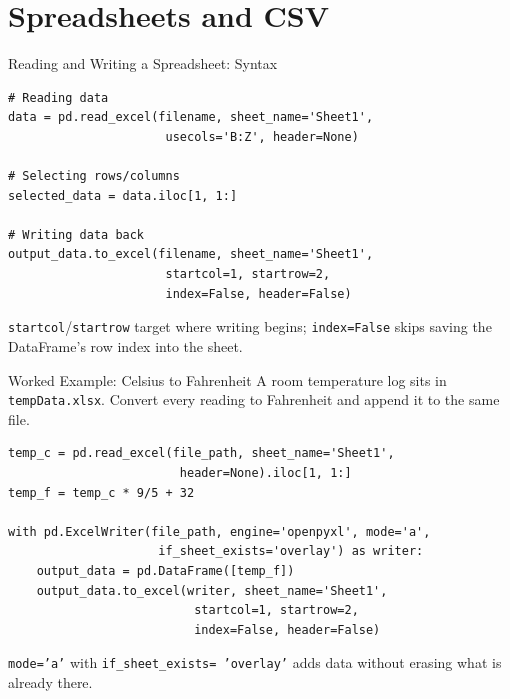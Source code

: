 \documentclass[9pt,aspectratio=169,xcolor=table]{beamer}
\begin{document}
\section{Spreadsheets and CSV}

\begin{frame}[fragile]{Reading and Writing a Spreadsheet: Syntax}
    \leavevmode
\begin{lstlisting}
# Reading data
data = pd.read_excel(filename, sheet_name='Sheet1',
                      usecols='B:Z', header=None)

# Selecting rows/columns
selected_data = data.iloc[1, 1:]

# Writing data back
output_data.to_excel(filename, sheet_name='Sheet1',
                      startcol=1, startrow=2,
                      index=False, header=False)
\end{lstlisting}

    \vspace{1mm}
    {\small \texttt{startcol}/\texttt{startrow} target where writing
    begins; \texttt{index=False} skips saving the DataFrame's row
    index into the sheet.}
\end{frame}

\begin{frame}[fragile]{Worked Example: Celsius to Fahrenheit}
    \leavevmode
    A room temperature log sits in \texttt{tempData.xlsx}. Convert
    every reading to Fahrenheit and append it to the same file.

\begin{lstlisting}
temp_c = pd.read_excel(file_path, sheet_name='Sheet1',
                        header=None).iloc[1, 1:]
temp_f = temp_c * 9/5 + 32

with pd.ExcelWriter(file_path, engine='openpyxl', mode='a',
                     if_sheet_exists='overlay') as writer:
    output_data = pd.DataFrame([temp_f])
    output_data.to_excel(writer, sheet_name='Sheet1',
                          startcol=1, startrow=2,
                          index=False, header=False)
\end{lstlisting}

    {\small \texttt{mode='a'} with \texttt{if\_sheet\_exists=
    'overlay'} adds data \alert{without erasing} what is already
    there.}
\end{frame}
\end{document}
